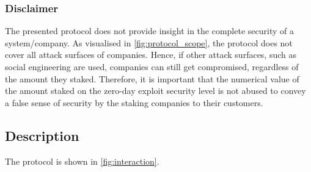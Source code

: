 \subsubsection{Disclaimer}
The presented protocol does not provide insight in the complete security of a system/company. As visualised in \cref{fig:protocol_scope}, the protocol does not cover all attack surfaces of companies. Hence, if other attack surfaces, such as social engineering are used, companies can still get compromised, regardless of the amount they staked. Therefore, it is important that the numerical value of the amount staked on the zero-day exploit security level is not abused to convey a false sense of security by the staking companies to their customers.

\subsection{Description}
The protocol is shown in \cref{fig:interaction}.
